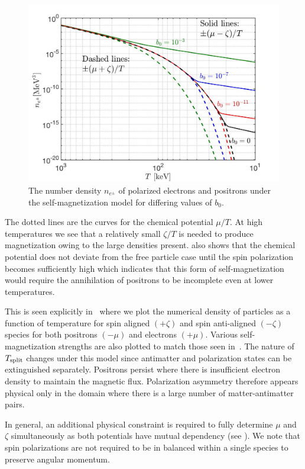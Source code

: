 \begin{figure}
 \centering
 \includegraphics[width=0.8\linewidth]{plots/ElectronDenisty_SpinChemicalPotential004.jpg}
 \caption{The number density $n_{e^{\pm}}$ of polarized electrons and positrons under the self-magnetization model for differing values of $b_{0}$. }
 \label{fig:polarswap} 
\end{figure}

The dotted lines are the curves for the chemical potential $\mu/T$. At high temperatures we see that a relatively small $\zeta/T$ is needed to produce magnetization owing to the large densities present.  also shows that the chemical potential does not deviate from the free particle case until the spin polarization becomes sufficiently high which indicates that this form of self-magnetization would require the annihilation of positrons to be incomplete even at lower temperatures.

This is seen explicitly in~ where we plot the numerical density of particles as a function of temperature for spin aligned $(+\zeta)$ and spin anti-aligned $(-\zeta)$ species for both positrons $(-\mu)$ and electrons $(+\mu)$. Various self-magnetization strengths are also plotted to match those seen in~. The nature of $T_{\rm split}$ changes under this model since antimatter and polarization states can be extinguished separately. Positrons persist where there is insufficient electron density to maintain the magnetic flux. Polarization asymmetry therefore appears physical only in the domain where there is a large number of matter-antimatter pairs.

\label{sec:inhomogeneous}
\noindent In general, an additional physical constraint is required to fully determine $\mu$ and $\zeta$ simultaneously as both potentials have mutual dependency (see ). We note that spin polarizations are not required to be in balanced within a single species to preserve angular momentum.


